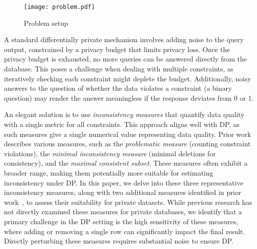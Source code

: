 \begin{figure}[t]
\texttt{[image: problem.pdf]}
\caption{Problem setup}\label{fig:problemsetup}
\end{figure}    

A standard differentially private mechanism involves adding noise to the query output, constrained by a privacy budget that limits privacy loss. Once the privacy budget is exhausted, no more queries can be answered directly from the database. This poses a challenge when dealing with multiple constraints, as iteratively checking each constraint might deplete the budget.
 Additionally, noisy answers to the question of whether the data violates a constraint (a binary question) may render the answer meaningless if the response deviates from 0 or 1.

An elegant solution is to use \emph{inconsistency measures} \cite{thimm2017compliance, parisi2019inconsistency, LivshitsKTIKR21} that quantify data quality with a single metric for all constraints. This approach aligns well with DP, as such measures give a single numerical value representing data quality. Prior work describes various measures, such as the \emph{problematic measure} (counting constraint violations), the \emph{minimal inconsistency measure} (minimal deletions for consistency), and the \emph{maximal consistent subset}. These measures often exhibit a broader range, making them potentially more suitable for estimating inconsistency under DP. In this paper, we delve into these three representative inconsistency measures, along with two additional measures identified in prior work~\cite{LivshitsKTIKR21}, to assess their suitability for private datasets. While previous research has not directly examined these measures for private databases, we identify that a primary challenge in the DP setting 
is the high sensitivity of these measures, 
where adding or removing a single row can significantly impact the final result.
Directly perturbing these measures requires substantial noise to ensure DP.
 


